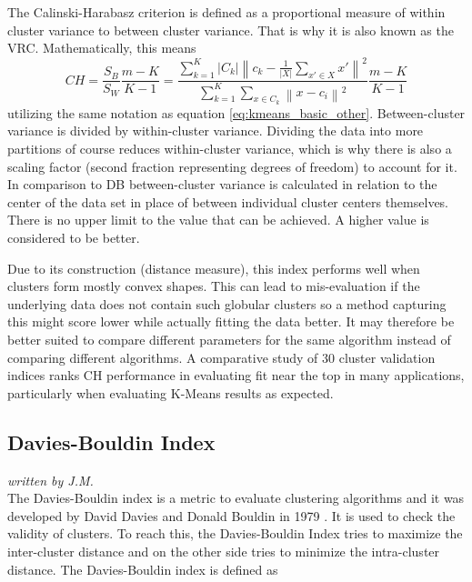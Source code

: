 The Calinski-Harabasz criterion \cite{calinski1974dendrite} is defined as a proportional measure of within cluster variance to between cluster variance. That is why it is also known as the \gls{VRC}. Mathematically, this means
\begin{equation}
        CH = \frac{S_{B}}{S_{W}}\frac{m-K}{K-1} = \frac{\sum_{k=1}^{K} \left | C_{k} \right | \left \| c_{k} - \frac{1}{\left | X \right |}\sum_{x' \in X}^{} x' \right \|^{2}}{\sum_{k=1}^{K}\sum_{x \in C_{k}}^{} \left \| x - c_{i} \right \|^{2}} \frac{m-K}{K-1}
\end{equation}
utilizing the same notation as equation \ref{eq:kmeans_basic_other}. Between-cluster variance is divided by within-cluster variance. Dividing the data into more partitions of course reduces within-cluster variance, which is why there is also a scaling factor (second fraction representing degrees of freedom) to account for it. In comparison to \gls{DB} between-cluster variance is calculated in relation to the center of the data set in place of between individual cluster centers themselves. There is no upper limit to the value that can be achieved. A higher value is considered to be better.

Due to its construction (distance measure), this index performs well when clusters form mostly convex shapes. This can lead to mis-evaluation if the underlying data does not contain such globular clusters so a method capturing this might score lower while actually fitting the data better. It may therefore be better suited to compare different parameters for the same algorithm instead of comparing different algorithms. A comparative study of 30 cluster validation indices \cite{arbelaitz2013extensive} ranks \gls{CH} performance in evaluating fit near the top in many applications, particularly when evaluating K-Means results as expected.
    
    
\subsection{Davies-Bouldin Index}
\textit{written by J.M.}\\

The Davies-Bouldin index is a metric to evaluate clustering algorithms and it was developed by David Davies and Donald Bouldin in 1979 \cite{davies1979cluster}. 
It is used to check the validity of clusters. To reach this, the Davies-Bouldin Index tries to maximize the inter-cluster distance 
and on the other side tries to minimize the intra-cluster distance. 
The Davies-Bouldin index is defined as \cite{davies1979cluster} 


